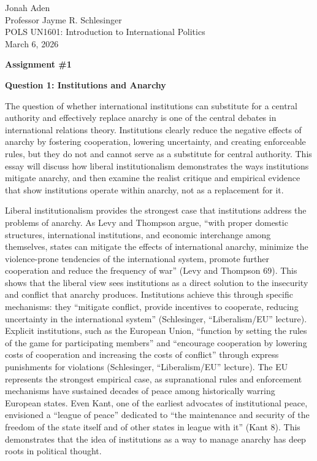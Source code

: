 \documentclass[12pt]{article}
\begin{document}
\thispagestyle{fancy}
{\setlength{\parindent}{0pt}
\noindent Jonah Aden\\
Professor Jayme R. Schlesinger\\
POLS UN1601: Introduction to International Politics\\
March 6, 2026

\begin{center}
\textbf{Assignment \#1}
\end{center}
}

\noindent \textbf{Question 1: Institutions and Anarchy}

The question of whether international institutions can substitute for a central authority and effectively replace anarchy is one of the central debates in international relations theory. Institutions clearly reduce the negative effects of anarchy by fostering cooperation, lowering uncertainty, and creating enforceable rules, but they do not and cannot serve as a substitute for central authority. This essay will discuss how liberal institutionalism demonstrates the ways institutions mitigate anarchy, and then examine the realist critique and empirical evidence that show institutions operate within anarchy, not as a replacement for it.

Liberal institutionalism provides the strongest case that institutions address the problems of anarchy. As Levy and Thompson argue, ``with proper domestic structures, international institutions, and economic interchange among themselves, states can mitigate the effects of international anarchy, minimize the violence-prone tendencies of the international system, promote further cooperation and reduce the frequency of war'' (Levy and Thompson 69). This shows that the liberal view sees institutions as a direct solution to the insecurity and conflict that anarchy produces. Institutions achieve this through specific mechanisms: they ``mitigate conflict, provide incentives to cooperate, reducing uncertainty in the international system'' (Schlesinger, ``Liberalism/EU'' lecture). Explicit institutions, such as the European Union, ``function by setting the rules of the game for participating members'' and ``encourage cooperation by lowering costs of cooperation and increasing the costs of conflict'' through express punishments for violations (Schlesinger, ``Liberalism/EU'' lecture). The EU represents the strongest empirical case, as supranational rules and enforcement mechanisms have sustained decades of peace among historically warring European states. Even Kant, one of the earliest advocates of institutional peace, envisioned a ``league of peace'' dedicated to ``the maintenance and security of the freedom of the state itself and of other states in league with it'' (Kant 8). This demonstrates that the idea of institutions as a way to manage anarchy has deep roots in political thought.
\end{document}

